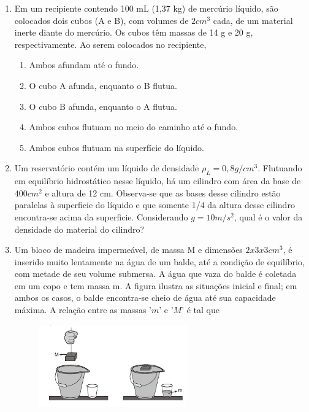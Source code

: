 \documentclass[12pt,letterpaper,fleqn]{article}
\begin{document}
\begin{enumerate}
    \item Em um recipiente contendo 100 mL (1,37 kg) de mercúrio líquido, são colocados dois cubos (A e B), com volumes de $2 cm^3$ cada, de um material inerte diante do mercúrio. Os cubos têm massas de 14 g e 20 g, respectivamente. Ao serem colocados no recipiente,
    \begin{enumerate}
        \item Ambos afundam até o fundo.
        \item O cubo A afunda, enquanto o B flutua.
        \item O cubo B afunda, enquanto o A flutua.
        \item Ambos cubos flutuam no meio do caminho até o fundo.
        \item Ambos cubos flutuam na superfície do líquido.
    \end{enumerate}
    
    \item Um reservatório contém um líquido de densidade $\rho_L=0,8 g/cm^3$. Flutuando em equilíbrio hidrostático nesse líquido, há um cilindro com área da base de $400 cm^2$ e altura de 12 cm. Observa-se que as bases desse cilindro estão paralelas à superficie do líquido e que somente 1/4 da altura desse cilindro encontra-se acima da superficie. Considerando $g = 10 m/s^2$, qual é o valor da densidade do material do cilindro?
    
    \item Um bloco de madeira impermeável, de massa M e dimensões $2 x 3 x 3 cm^3$, é inserido muito lentamente na água de um balde, até a condição de equilíbrio, com metade de seu volume submersa. A água que vaza do balde é coletada em um copo e tem massa m. A figura ilustra as situações inicial e final; em ambos os casos, o balde encontra-se cheio de água até sua capacidade máxima. A relação entre as massas '$m$' e '$M$' é tal que
    
    \begin{figure}[H]
        \centering
        \includegraphics[width=0.6\textwidth]{ex_7.png}
    \end{figure}
    

\end{enumerate}
\end{document}

